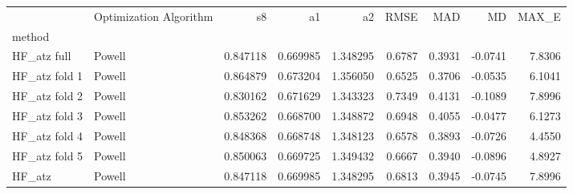 \begin{tabular}{llrrrrrrr}
 & Optimization Algorithm & s8 & a1 & a2 & RMSE & MAD & MD & MAX_E \\
method &  &  &  &  &  &  &  &  \\
HF_atz full & Powell & 0.847118 & 0.669985 & 1.348295 & 0.6787 & 0.3931 & -0.0741 & 7.8306 \\
HF_atz fold 1 & Powell & 0.864879 & 0.673204 & 1.356050 & 0.6525 & 0.3706 & -0.0535 & 6.1041 \\
HF_atz fold 2 & Powell & 0.830162 & 0.671629 & 1.343323 & 0.7349 & 0.4131 & -0.1089 & 7.8996 \\
HF_atz fold 3 & Powell & 0.853262 & 0.668700 & 1.348872 & 0.6948 & 0.4055 & -0.0477 & 6.1273 \\
HF_atz fold 4 & Powell & 0.848368 & 0.668748 & 1.348123 & 0.6578 & 0.3893 & -0.0726 & 4.4550 \\
HF_atz fold 5 & Powell & 0.850063 & 0.669725 & 1.349432 & 0.6667 & 0.3940 & -0.0896 & 4.8927 \\
HF_atz & Powell & 0.847118 & 0.669985 & 1.348295 & 0.6813 & 0.3945 & -0.0745 & 7.8996 \\
\end{tabular}
